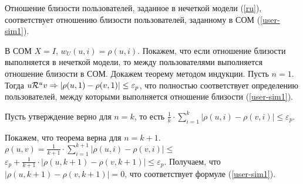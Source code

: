 \begin{trm}
	Отношение близости пользователей, заданное в нечеткой модели (\ref{ru}), соответствует
	отношению близости пользователей, заданному в СОМ (\ref{user-sim1}).
\end{trm}

В СОМ $X = I$, $w_U(u, i) = \rho(u, i)$. Покажем, что если
отношение близости выполняется в нечеткой модели, то между пользователями
выполняется отношение близости в СОМ.
Докажем теорему методом индукции.
Пусть $n = 1$. Тогда
$u \mathcal{R}^u v \Rightarrow |\rho(u, 1) - \rho(v, 1)| \le
\varepsilon_p$,
что полностью соответствует определению пользователей, между
которыми выполняется отношение близости (\ref{user-sim1}).

Пусть утверждение верно для $n = k$, то есть $\frac{1}{k} \cdot \sum
\limits_{i=1}^k|\rho(u, i) - \rho(v, i)| \le \varepsilon_p$.

Покажем, что теорема верна для $n = k + 1$.
$\rho(u, v) = \frac{1}{k + 1} \cdot \sum \limits_{i=1}^{k+1} |\rho(u,i) -
\rho(v,i)| \le $
$\varepsilon_p + \frac{1}{k + 1} \cdot |\rho(u, k+1) -
\rho(v, k+1)| \le \varepsilon_p$. Получаем, что
$|\rho(u, k+1) - \rho(v, k+1)| = 0$,
что соответствует формуле
(\ref{user-sim1}).

